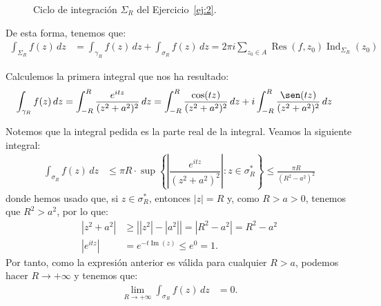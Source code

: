 \documentclass[12pt]{article}
\renewcommand{\Im}{\operatorname{Im}}
\DeclareMathOperator{\Ind}{Ind}
\DeclareMathOperator{\Res}{Res}
\begin{document}
\begin{ejercicio}[2.5 puntos]
\begin{figure}
            \caption{Ciclo de integración $\Sigma_R$ del Ejercicio~\ref{ej:2}.}
            \label{fig:ej:2}
        \end{figure}

        De esta forma, tenemos que:
        \begin{align*}
            \int_{\Sigma_R} f(z) \, dz &= \int_{\gamma_R} f(z) \, dz + \int_{\sigma_R} f(z) \, dz
            = 2\pi i\sum_{z_0\in A}\Res(f,z_0)\Ind_{\Sigma_R}(z_0)
        \end{align*}

        Calculemos la primera integral que nos ha resultado:
        \begin{align*}
            \int_{\gamma_R} f(z) \, dz &= \int_{-R}^{R} \frac{e^{i t z}}{(z^2 + a^2)^2} \, dz
            = \int_{-R}^{R} \frac{\cos(t z)}{(z^2 + a^2)^2} \, dz
            + i\int_{-R}^{R} \frac{\sen(t z)}{(z^2 + a^2)^2} \, dz
        \end{align*}

        Notemos que la integral pedida es la parte real de la integral. Veamos la siguiente integral:
        \begin{align*}
            \int_{\sigma_R} f(z) \, dz &\leq \pi R\cdot \sup\left\{\left|\dfrac{e^{i t z}}{(z^2 + a^2)^2}\right| : z\in \sigma_R^*\right\}
            \leq \frac{\pi R}{(R^2 - a^2)^2}
        \end{align*}
        donde hemos usado que, si $z\in \sigma_R^*$, entonces $|z|=R$ y, como $R>a>0$, tenemos que $R^2>a^2$, por lo que:
        \begin{align*}
            |z^2 + a^2| &\geq \left||z^2| - |a^2|\right| = \left|R^2 - a^2\right| = R^2 - a^2\\
            |e^{i t z}| &=e^{-t\Im(z)}\leq e^0 = 1.
        \end{align*}
        Por tanto, como la expresión anterior es válida para cualquier $R > a$, podemos hacer $R \to +\infty$ y tenemos que:
        \begin{align*}
            \lim_{R\to+\infty} \int_{\sigma_R} f(z) \, dz &= 0.
        \end{align*}


\end{ejercicio}
\end{document}
